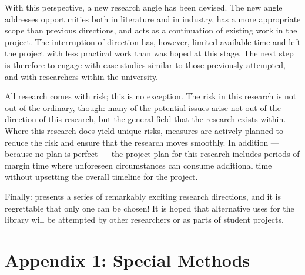 \documentclass[draft]{article}
\begin{document}
With this perspective, a new research angle has been devised. The new angle
addresses opportunities both in literature and in industry, has a more
appropriate scope than previous directions, and acts as a continuation of
existing work in the project\cite{caise_forum_18}. The interruption of direction
has, however, limited available time and left the project with less practical
work than was hoped at this stage. The next step is therefore to engage with
case studies similar to those previously attempted, and with researchers within
the university.\par

All research comes with risk; this is no exception. The risk in this research is
not out-of-the-ordinary, though: many of the potential issues arise not out of
the direction of this research, but the general field that the research exists
within. Where this research does yield unique risks, measures are actively
planned to reduce the risk and ensure that the research moves smoothly. In
addition --- because no plan is perfect --- the project plan for this research
includes periods of margin time where unforeseen circumstances can consume
additional time without upsetting the overall timeline for the project.\par

Finally: \pdsf{} presents a series of remarkably exciting research directions,
and it is regrettable that only one can be chosen! It is hoped that alternative
uses for the library will be attempted by other researchers or as parts of
student projects.\par











\appendix

\newpage
\section*{Appendix 1: \pdsf{} Special Methods}
\label{app:special_methods}
\end{document}
